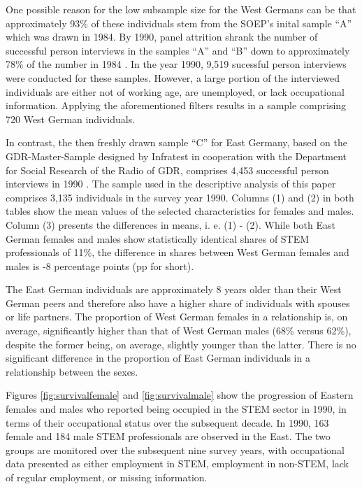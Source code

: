 \documentclass[a4paper, oneside, hyperfootnotes = false]{article}
\begin{document}
{\begin{table}[ht]
\begin{center}
	\end{center}
\end{table}

One possible reason for the low subsample size for the West Germans can be that approximately 93\% of these individuals stem from the SOEP's inital sample ``A'' which was drawn in 1984.
By 1990, panel attrition shrank the number of successful person interviews in the samples ``A'' and ``B'' down to approximately 78\% of the number in 1984 \citep{Siegers2022}.
In the year 1990, 9,519 sucessful person interviews were conducted for these samples.
However, a large portion of the interviewed individuals are either not of working age, are unemployed, or lack occupational information.
Applying the aforementioned filters results in a sample comprising 720 West German individuals.

In contrast, the then freshly drawn sample ``C'' for East Germany, based on the GDR-Master-Sample designed by Infratest in cooperation with the Department for Social Research of the Radio of GDR, comprises 4,453 successful person interviews in 1990 \citep{Infratest2011, Siegers2022}.
The sample used in the descriptive analysis of this paper comprises 3,135 individuals in the survey year 1990.
Columns (1) and (2) in both tables show the mean values of the selected characteristics for females and males.
Column (3) presents the differences in means, i. e. (1) - (2).
While both East German females and males show statistically identical shares of STEM professionals of 11\%, the difference in shares between West German females and males is -8 percentage points (pp for short).

The East German individuals are approximately 8 years older than their West German peers and therefore also have a higher share of individuals with spouses or life partners.
The proportion of West German females in a relationship is, on average, significantly higher than that of West German males (68\% versus 62\%), despite the former being, on average, slightly younger than the latter.
There is no significant difference in the proportion of East German individuals in a relationship between the sexes.

Figures \ref{fig:survivalfemale} and \ref{fig:survivalmale} show the progression of Eastern females and males who reported being occupied in the STEM sector in 1990, in terms of their occupational status over the subsequent decade.
In 1990, 163 female and 184 male STEM professionals are observed in the East.
The two groups are monitored over the subsequent nine survey years, with occupational data presented as either employment in STEM, employment in non-STEM, lack of regular employment, or missing information.

}
\end{document}
